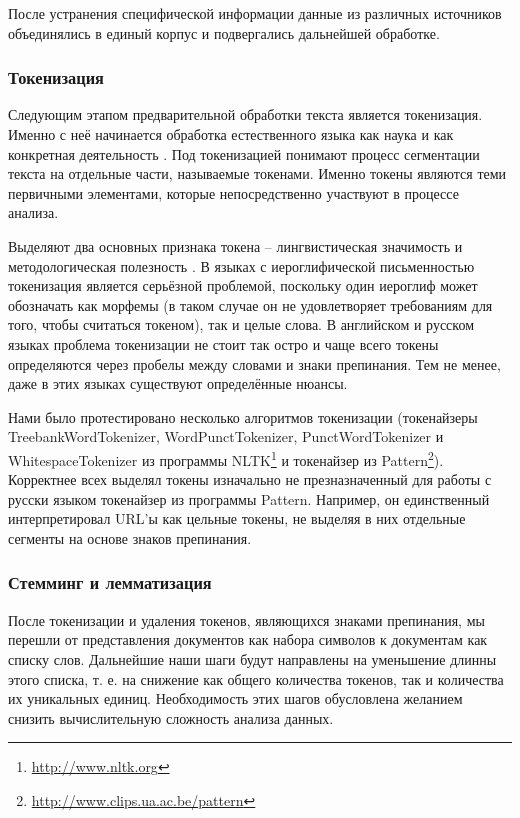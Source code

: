 После устранения специфической информации данные из различных источников объединялись в единый корпус и подвергались дальнейшей обработке.

\subsubsection{Токенизация}
Следующим этапом предварительной обработки текста является токенизация. Именно с неё начинается обработка естественного языка как наука и как конкретная деятельность \cite{Webster1992}. Под токенизацией понимают процесс сегментации текста на отдельные части, называемые токенами. Именно токены являются теми первичными элементами, которые непосредственно участвуют в процессе анализа. 

Выделяют два основных признака токена -- лингвистическая значимость и методологическая полезность \cite[стр. 1106]{Webster1992}. В языках с иероглифической письменностью токенизация является серьёзной проблемой, поскольку один иероглиф может обозначать как морфемы (в таком случае он не удовлетворяет требованиям для того, чтобы считаться токеном), так и целые слова. В английском и русском языках проблема токенизации не стоит так остро и чаще всего токены определяются через пробелы между словами и знаки препинания. Тем не менее, даже в этих языках существуют определённые нюансы.

Нами было протестировано несколько алгоритмов токенизации (токенайзеры TreebankWordTokenizer, WordPunctTokenizer, PunctWordTokenizer и WhitespaceTokenizer из программы NLTK\footnote{\href{http://www.nltk.org}{http://www.nltk.org}} и токенайзер из Pattern\footnote{\href{http://www.clips.ua.ac.be/pattern}{http://www.clips.ua.ac.be/pattern}}). Корректнее всех выделял токены изначально не презназначенный для работы с русски языком токенайзер из программы Pattern. Например, он единственный интерпретировал URL'ы как цельные токены, не выделяя в них отдельные сегменты на основе знаков препинания.

\subsubsection{Стемминг и лемматизация}
После токенизации и удаления токенов, являющихся знаками препинания, мы перешли от представления документов как набора символов к документам как списку слов. Дальнейшие наши шаги будут направлены на уменьшение длинны этого списка, т. е. на снижение как общего количества токенов, так и количества их уникальных единиц. Необходимость этих шагов обусловлена желанием снизить вычислительную сложность анализа данных.

